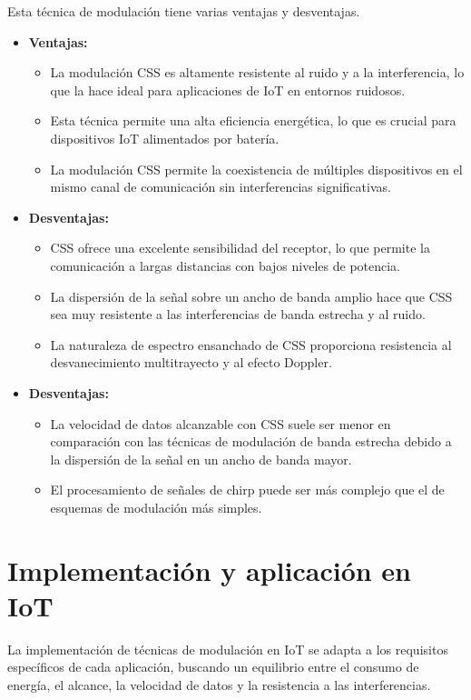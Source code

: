 \documentclass[12pt, letterpaper]{article}
\begin{document}
Esta técnica de modulación tiene varias ventajas y desventajas.
\begin{itemize}
    \item \textbf{Ventajas:}
    \begin{itemize}
        \item La modulación CSS es altamente resistente al ruido y a la interferencia, lo que la hace ideal para aplicaciones de IoT en entornos ruidosos.
        \item Esta técnica permite una alta eficiencia energética, lo que es crucial para dispositivos IoT alimentados por batería.
        \item La modulación CSS permite la coexistencia de múltiples dispositivos en el mismo canal de comunicación sin interferencias significativas.
    \end{itemize}

    \item \textbf{Desventajas:}
    \begin{itemize}
        \item CSS ofrece una excelente sensibilidad del receptor, lo que permite la comunicación a largas distancias con bajos niveles de potencia.
        \item La dispersión de la señal sobre un ancho de banda amplio hace que CSS sea muy resistente a las interferencias de banda estrecha y al ruido.
        \item La naturaleza de espectro ensanchado de CSS proporciona resistencia al desvanecimiento multitrayecto y al efecto Doppler.
    \end{itemize}

    \item \textbf{Desventajas:}
    \begin{itemize}
        \item La velocidad de datos alcanzable con CSS suele ser menor en comparación con las técnicas de modulación de banda estrecha debido a la dispersión de la señal en un ancho de banda mayor.
        \item El procesamiento de señales de chirp puede ser más complejo que el de esquemas de modulación más simples.
    \end{itemize}
\end{itemize}

\vspace{1em}
\section{Implementación y aplicación en IoT}
La implementación de técnicas de modulación en IoT se adapta a los requisitos específicos de cada aplicación, buscando un equilibrio entre el consumo de energía, el alcance, la velocidad de datos y la resistencia a las interferencias.
\end{document}
